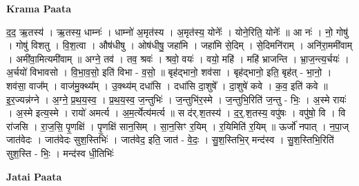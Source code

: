 \documentclass[17pt]{extarticle}
\begin{document}
\textbf{Krama Paata} \newline

द॒द॒ ऋ॒तस्य॑ । ऋ॒तस्य॒ धाम्नः॑ । धाम्नो॑ अ॒मृत॑स्य । अ॒मृत॑स्य॒ योनेः᳚ । योने॒रिति॒ योनेः᳚ ॥ आ नः॑ । नो॒ गोषु॑ । गोषु॑ विशतु । वि॒श॒त्वा । औष॑धीषु । ओष॑धीषु॒ जहा॑मि । जहा॑मि से॒दिम् । से॒दिमनि॑राम् । अनि॑रा॒ममी॑वाम् । अमी॑वा॒मित्यमी॑वाम् ॥ अग्ने॒ तव॑ । तव॒ श्रवः॑ । श्रवो॒ वयः॑ । वयो॒ महि॑ । महि॑ भ्राजन्ति । भ्रा॒ज॒न्त्य॒र्चयः॑ । अ॒र्चयो॑ विभावसो । वि॒भा॒व॒सो॒ इति॑ विभा - व॒सो॒ ॥ बृह॑द्भानो॒ शव॑सा । बृह॑द्भानो॒ इति॒ बृह॑त् - भा॒नो॒ । शव॑सा॒ वाज᳚म् । वाज॑मु॒क्थ्य᳚म् । उ॒क्थ्य॑म् दधा॑सि । दधा॑सि दा॒शुषे᳚ । दा॒शुषे॑ कवे । क॒व॒ इति॑ कवे ॥ इ॒र॒ज्यन्न॑ग्ने । अ॒ग्ने॒ प्र॒थ॒य॒स्व॒ । प्र॒थ॒य॒स्व॒ ज॒न्तुभिः॑ । ज॒न्तुभि॑र॒स्मे । ज॒न्तुभि॒रिति॑ ज॒न्तु - भिः॒ । अ॒स्मे रायः॑ । अ॒स्मे इत्य॒स्मे । रायो॑ अमर्त्य । अ॒म॒र्त्येत्य॑मर्त्य ॥ स द॑र्.श॒तस्य॑ । द॒र्॒.श॒तस्य॒ वपु॑षः । वपु॑षो॒ वि । वि रा॑जसि । रा॒ज॒सि॒ पृ॒णक्षि॑ । पृ॒णक्षि॑ सान॒सिम् । सा॒न॒सिꣳ र॒यिम् । र॒यिमिति॑ र॒यिम् ॥ ऊर्जो॑ नपात् । न॒पा॒ज् जात॑वेदः । जात॑वेदः सुश॒स्तिभिः॑ । जात॑वेद॒ इति॒ जात॑ - वे॒दः॒ । सु॒श॒स्तिभि॒र् मन्द॑स्व । सु॒श॒स्तिभि॒रिति॑ सुश॒स्ति - भिः॒ । मन्द॑स्व धी॒तिभिः॑ \newline

\textbf{Jatai Paata} \newline
\end{document}

